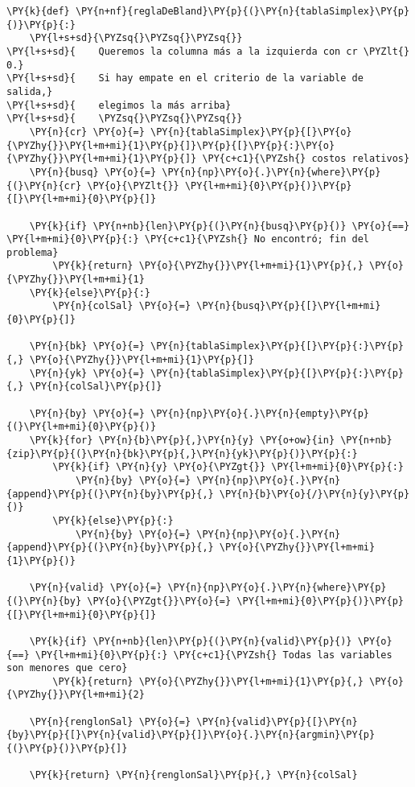 \begin{tcolorbox}[breakable, size=fbox, boxrule=1pt, pad at break*=1mm,colback=cellbackground, colframe=cellborder]
\begin{Verbatim}[commandchars=\\\{\}]
\PY{k}{def} \PY{n+nf}{reglaDeBland}\PY{p}{(}\PY{n}{tablaSimplex}\PY{p}{)}\PY{p}{:}
    \PY{l+s+sd}{\PYZsq{}\PYZsq{}\PYZsq{}}
\PY{l+s+sd}{    Queremos la columna más a la izquierda con cr \PYZlt{} 0.}
\PY{l+s+sd}{    Si hay empate en el criterio de la variable de salida,}
\PY{l+s+sd}{    elegimos la más arriba}
\PY{l+s+sd}{    \PYZsq{}\PYZsq{}\PYZsq{}}
    \PY{n}{cr} \PY{o}{=} \PY{n}{tablaSimplex}\PY{p}{[}\PY{o}{\PYZhy{}}\PY{l+m+mi}{1}\PY{p}{]}\PY{p}{[}\PY{p}{:}\PY{o}{\PYZhy{}}\PY{l+m+mi}{1}\PY{p}{]} \PY{c+c1}{\PYZsh{} costos relativos}
    \PY{n}{busq} \PY{o}{=} \PY{n}{np}\PY{o}{.}\PY{n}{where}\PY{p}{(}\PY{n}{cr} \PY{o}{\PYZlt{}} \PY{l+m+mi}{0}\PY{p}{)}\PY{p}{[}\PY{l+m+mi}{0}\PY{p}{]}
    
    \PY{k}{if} \PY{n+nb}{len}\PY{p}{(}\PY{n}{busq}\PY{p}{)} \PY{o}{==} \PY{l+m+mi}{0}\PY{p}{:} \PY{c+c1}{\PYZsh{} No encontró; fin del problema}
        \PY{k}{return} \PY{o}{\PYZhy{}}\PY{l+m+mi}{1}\PY{p}{,} \PY{o}{\PYZhy{}}\PY{l+m+mi}{1}
    \PY{k}{else}\PY{p}{:}
        \PY{n}{colSal} \PY{o}{=} \PY{n}{busq}\PY{p}{[}\PY{l+m+mi}{0}\PY{p}{]}
        
    \PY{n}{bk} \PY{o}{=} \PY{n}{tablaSimplex}\PY{p}{[}\PY{p}{:}\PY{p}{,} \PY{o}{\PYZhy{}}\PY{l+m+mi}{1}\PY{p}{]}
    \PY{n}{yk} \PY{o}{=} \PY{n}{tablaSimplex}\PY{p}{[}\PY{p}{:}\PY{p}{,} \PY{n}{colSal}\PY{p}{]}
    
    \PY{n}{by} \PY{o}{=} \PY{n}{np}\PY{o}{.}\PY{n}{empty}\PY{p}{(}\PY{l+m+mi}{0}\PY{p}{)}
    \PY{k}{for} \PY{n}{b}\PY{p}{,}\PY{n}{y} \PY{o+ow}{in} \PY{n+nb}{zip}\PY{p}{(}\PY{n}{bk}\PY{p}{,}\PY{n}{yk}\PY{p}{)}\PY{p}{:}
        \PY{k}{if} \PY{n}{y} \PY{o}{\PYZgt{}} \PY{l+m+mi}{0}\PY{p}{:}
            \PY{n}{by} \PY{o}{=} \PY{n}{np}\PY{o}{.}\PY{n}{append}\PY{p}{(}\PY{n}{by}\PY{p}{,} \PY{n}{b}\PY{o}{/}\PY{n}{y}\PY{p}{)}
        \PY{k}{else}\PY{p}{:}
            \PY{n}{by} \PY{o}{=} \PY{n}{np}\PY{o}{.}\PY{n}{append}\PY{p}{(}\PY{n}{by}\PY{p}{,} \PY{o}{\PYZhy{}}\PY{l+m+mi}{1}\PY{p}{)}
    
    \PY{n}{valid} \PY{o}{=} \PY{n}{np}\PY{o}{.}\PY{n}{where}\PY{p}{(}\PY{n}{by} \PY{o}{\PYZgt{}}\PY{o}{=} \PY{l+m+mi}{0}\PY{p}{)}\PY{p}{[}\PY{l+m+mi}{0}\PY{p}{]}
    
    \PY{k}{if} \PY{n+nb}{len}\PY{p}{(}\PY{n}{valid}\PY{p}{)} \PY{o}{==} \PY{l+m+mi}{0}\PY{p}{:} \PY{c+c1}{\PYZsh{} Todas las variables son menores que cero}
        \PY{k}{return} \PY{o}{\PYZhy{}}\PY{l+m+mi}{1}\PY{p}{,} \PY{o}{\PYZhy{}}\PY{l+m+mi}{2}
    
    \PY{n}{renglonSal} \PY{o}{=} \PY{n}{valid}\PY{p}{[}\PY{n}{by}\PY{p}{[}\PY{n}{valid}\PY{p}{]}\PY{o}{.}\PY{n}{argmin}\PY{p}{(}\PY{p}{)}\PY{p}{]}
    
    \PY{k}{return} \PY{n}{renglonSal}\PY{p}{,} \PY{n}{colSal}
\end{Verbatim}
\end{tcolorbox}

